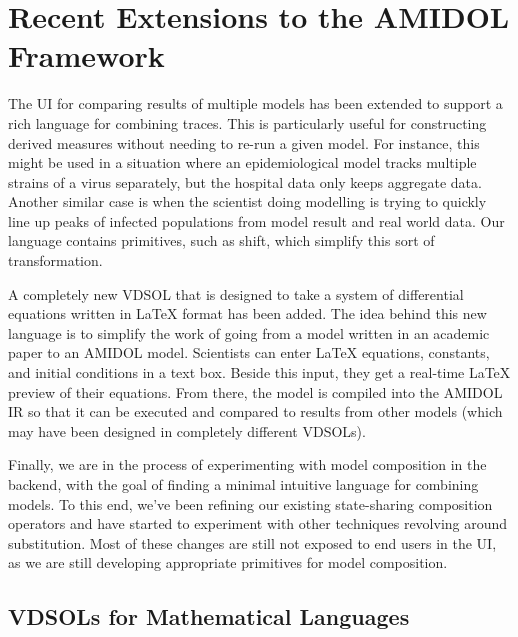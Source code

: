 \documentclass[12pt]{galois-whitepaper}
\begin{document}
\section{Recent Extensions to the AMIDOL Framework}

The UI for comparing results of multiple models has been extended to
support a rich language for combining traces. This is particularly
useful for constructing derived measures without needing to re-run a given
model. For instance, this might be used in a situation where an
epidemiological model tracks multiple strains of a virus separately,
but the hospital data only keeps aggregate data. Another similar case
is when the scientist doing modelling is trying to quickly line up
peaks of infected populations from model result and real world
data. Our language contains primitives, such as shift, which simplify this
sort of transformation.

A completely new VDSOL that is designed to take a system of
differential equations written in LaTeX format has been added. The
idea behind this new language is to simplify the work of going from a
model written in an academic paper to an AMIDOL model. Scientists can
enter LaTeX equations, constants, and initial conditions in a text
box. Beside this input, they get a real-time LaTeX preview of their
equations. From there, the model is compiled into the AMIDOL IR so
that it can be executed and compared to results from other models
(which may have been designed in completely different VDSOLs).

Finally, we are in the process of experimenting with model composition
in the backend, with the goal of finding a minimal intuitive language
for combining models. To this end, we’ve been refining our existing
state-sharing composition operators and have started to experiment
with other techniques revolving around substitution. Most of these
changes are still not exposed to end users in the UI, as we are still
developing appropriate primitives for model composition.

\subsection{VDSOLs for Mathematical Languages}
\end{document}
